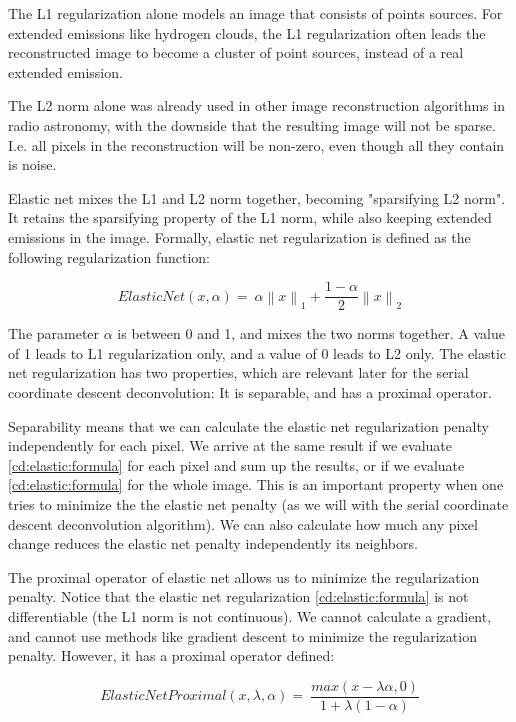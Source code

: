  
The L1 regularization alone models an image that consists of points sources. For extended emissions like hydrogen clouds, the L1 regularization often leads the reconstructed image to become a cluster of point sources, instead of a real extended emission.

The L2 norm alone was already used in other image reconstruction algorithms in radio astronomy\cite{ferrari2014distributed}, with the downside that the resulting image will not be sparse. I.e. all pixels in the reconstruction will be non-zero, even though all they contain is noise. 

Elastic net mixes the L1 and L2 norm together, becoming "sparsifying L2 norm". It retains the sparsifying property of the L1 norm, while also keeping extended emissions in the image. Formally, elastic net regularization is defined as the following regularization function:

\begin{equation}\label{cd:elastic:formula}
ElasticNet(x, \alpha) = \: \alpha \left \|x \right \|_1 + \frac{1-\alpha}{2}  \left \|x \right \|_2
\end{equation}

The parameter $\alpha$ is between 0 and 1, and mixes the two norms together. A value of 1 leads to L1 regularization only, and a value of 0 leads to L2 only. The elastic net regularization has two properties, which are relevant later for the serial coordinate descent deconvolution: It is separable, and has a proximal operator.

Separability means that we can calculate the elastic net regularization penalty independently for each pixel. We arrive at the same result if we evaluate \eqref{cd:elastic:formula} for each pixel and sum up the results, or if we evaluate \eqref{cd:elastic:formula} for the whole image. This is an important property when one tries to minimize the the elastic net penalty (as we will with the serial coordinate descent deconvolution algorithm). We can also calculate how much any pixel change reduces the elastic net penalty independently its neighbors.

The proximal operator of elastic net allows us to minimize the regularization penalty. Notice that the elastic net regularization \eqref{cd:elastic:formula} is not differentiable (the L1 norm is not continuous). We cannot calculate a gradient, and cannot use methods like gradient descent to minimize the regularization penalty. However, it has a proximal operator defined:

\begin{equation}\label{cd:elastic:proximal}
ElasticNetProximal(x, \lambda ,\alpha) = \: \frac{max(x - \lambda \alpha, 0)}{1+\lambda(1 - \alpha)}
\end{equation}

